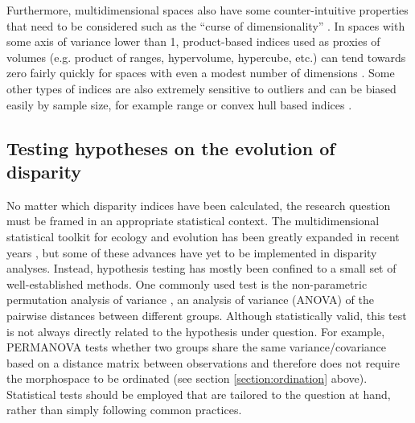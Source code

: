 \documentclass[12pt,letterpaper]{article}
\begin{document}
Furthermore, multidimensional spaces also have some counter-intuitive properties that need to be considered such as the ``curse of dimensionality'' \citep{Bellman1966-mc}.
In spaces with some axis of variance lower than 1, product-based indices used as proxies of volumes (e.g. product of ranges, hypervolume, hypercube, etc.) can tend towards zero fairly quickly for spaces with even a modest number of dimensions \citep{Bellman1966-mc}.
Some other types of indices are also extremely sensitive to outliers and can be biased easily by sample size, for example range \citep{Foote1992-zs} or convex hull based indices \citep{Jackson2011-kq}.

\subsection{Testing hypotheses on the evolution of disparity} \label{section:testing}

No matter which disparity indices have been calculated, the research question must be framed in an appropriate statistical context.
The multidimensional statistical toolkit for ecology and evolution has been greatly expanded in recent years \citep{clavel2015mvmorph, Adams2018-mg}, but some of these advances have yet to be implemented in disparity analyses. Instead, hypothesis testing has mostly been confined to a small set of well-established methods.
One commonly used test is the non-parametric permutation analysis of variance \citep{Anderson2001-qb, Anderson2013-zt}, an analysis of variance (ANOVA) of the pairwise distances between different groups.
Although statistically valid, this test is not always directly related to the hypothesis under question.
For example, PERMANOVA tests whether two groups share the same variance/covariance based on a distance matrix between observations and therefore does not require the morphospace to be ordinated (see section \ref{section:ordination} above).
Statistical tests should be employed that are tailored to the question at hand, rather than simply following common practices.
\end{document}
